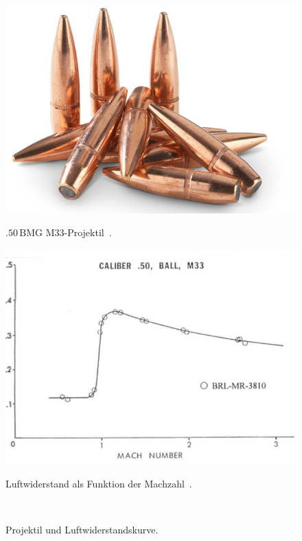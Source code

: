\begin{figure}
    \centering
    \begin{minipage}[t]{0.4\textwidth}
        \centering
        \includegraphics[width=\linewidth]{papers/ueberschall/figures/50-cal_projectile.jpg}
        \caption*{$.50\,\text{BMG}$ M33-Projektil~\cite{ArmoryFarm50BMG}.}
    \end{minipage}
    \hfill
    \begin{minipage}[t]{0.55\textwidth}
        \centering
        \includegraphics[width=\linewidth]{papers/ueberschall/figures/50-M33 Geschoss.jpg}
        \caption*{Luftwiderstand als Funktion der Machzahl~\cite{Mittelkaliber2020}.}
    \end{minipage}
    \caption{Projektil und Luftwiderstandskurve.}
    ~\label{fig:luftwiderstand_50-M33}
\end{figure}

